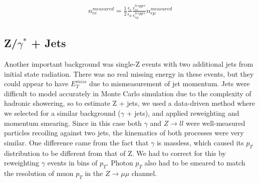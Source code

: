 \begin{gather}
n_{ee}^{measured} = \frac{1}{2}\frac{\epsilon_e}{\epsilon_{\mu}}\frac{\epsilon_{ee}^{trigger}}{\epsilon_{e\mu}^{trigger}}n_{e\mu}^{measured}
\end{gather}

\subsection*{Z/$\gamma^*$ + Jets}

Another important background was single-Z events with two additional jets from initial state radiation. There was no real missing energy in these events, but they could appear to have $E_T^{miss}$ due to mismeasurement of jet momentum. Jets were difficult to model accurately in Monte Carlo simulation due to the complexity of hadronic showering, so to estimate Z + jets, we used a data-driven method where we selected for a similar background ($\gamma$ + jets), and applied reweighting and momentum smearing. Since in this case both $\gamma$ and $Z\rightarrow ll$ were well-measured particles recoiling against two jets, the kinematics of both processes were very similar. One difference came from the fact that $\gamma$ is massless, which caused its $p_T$ distribution to be different from that of Z. We had to correct for this by reweighting $\gamma$ events in bins of $p_T$. Photon $p_T$ also had to be smeared to match the resolution of muon $p_T$ in the $Z\rightarrow\mu\mu$ channel.



